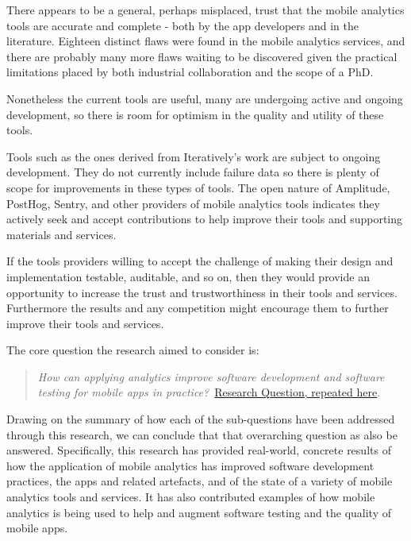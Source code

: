 There appears to be a general, perhaps misplaced, trust that the mobile analytics tools are accurate and complete - both by the app developers and in the literature. Eighteen distinct flaws were found in the mobile analytics services, and there are probably many more flaws waiting to be discovered given the practical limitations placed by both industrial collaboration and the scope of a PhD. 

Nonetheless the current tools are useful, many are undergoing active and ongoing development, so there is room for optimism in the quality and utility of these tools.


Tools such as the ones derived from Iteratively's work are subject to ongoing development. They do not currently include failure data so there is plenty of scope for improvements in these types of tools.  The open nature of Amplitude, PostHog, Sentry, and other providers of mobile analytics tools indicates they actively seek and accept contributions to help improve their tools and supporting materials and services. 

If the tools providers willing to accept the challenge of making their design and implementation testable, auditable, and so on, then they would provide an opportunity to increase the trust and trustworthiness in their tools and services. Furthermore the results and any competition might encourage them to further improve their tools and services.


The core question the research aimed to consider is:
\begin{quote}
  \emph{How can applying analytics improve software development and software testing for mobile apps in practice?}~\href{overall-research-question}{Research Question, repeated here}.
\end{quote}

Drawing on the summary of how each of the sub-questions have been addressed through this research, we can conclude that that overarching question as also be answered. Specifically, this research has provided real-world, concrete results of how the application of mobile analytics has improved software development practices, the apps and related artefacts, and of the state of a variety of mobile analytics tools and services. It has also contributed examples of how mobile analytics is being used to help and augment software testing and the quality of mobile apps. 


